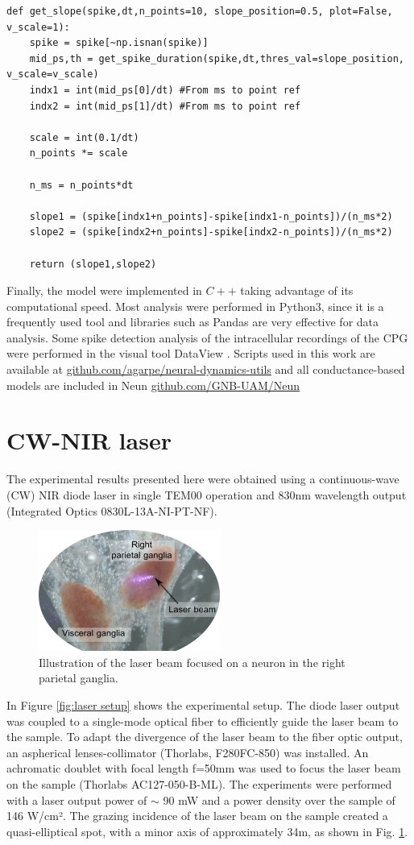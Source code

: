 \begin{lstlisting}
def get_slope(spike,dt,n_points=10, slope_position=0.5, plot=False, v_scale=1):
	spike = spike[~np.isnan(spike)] 
	mid_ps,th = get_spike_duration(spike,dt,thres_val=slope_position, v_scale=v_scale)
	indx1 = int(mid_ps[0]/dt) #From ms to point ref
	indx2 = int(mid_ps[1]/dt) #From ms to point ref
	
	scale = int(0.1/dt)
	n_points *= scale
	
	n_ms = n_points*dt
	
	slope1 = (spike[indx1+n_points]-spike[indx1-n_points])/(n_ms*2) 
	slope2 = (spike[indx2+n_points]-spike[indx2-n_points])/(n_ms*2)

	return (slope1,slope2)
\end{lstlisting}

Finally, the model were implemented in $C++$ taking advantage of its computational speed. Most analysis were performed in Python3, since it is a frequently used tool and libraries such as Pandas are very effective for data analysis. Some spike detection analysis of the intracellular recordings of the CPG were performed in the visual tool DataView \parencite{heitler_dataview_2007}. Scripts used in this work are available at \href{https://github.com/agarpe/neural-dynamics-utils}{github.com/agarpe/neural-dynamics-utils} and all conductance-based models are included in Neun \href{https://github.com/GNB-UAM/Neun}{github.com/GNB-UAM/Neun}


\section{CW-NIR laser}
The experimental results presented here were obtained using a continuous-wave (CW) NIR diode laser in single TEM00 operation and 830nm wavelength output (Integrated Optics 0830L-13A-NI-PT-NF). 
\begin{figure}
    \centering
	\includegraphics{img/laser/laser-beam.png}
	\caption{Illustration of the laser beam focused on a neuron in the right parietal ganglia.}
	\label{fig:laser beam}
\end{figure} 
In Figure \ref{fig:laser setup} shows the experimental setup. The diode laser output was coupled to a single-mode optical fiber to efficiently guide the laser beam to the sample. To adapt the divergence of the laser beam to the fiber optic output, an aspherical lenses-collimator (Thorlabs, F280FC-850) was installed. An achromatic doublet with focal length f=50mm was used to focus the laser beam on the sample (Thorlabs AC127-050-B-ML). The experiments were performed with a laser output power of $\sim$ 90 mW and a power density over the sample of 146 W/cm². The grazing incidence of the laser beam on the sample created a quasi-elliptical spot, with a minor axis of approximately 34{\textmu}m, as shown in Fig. \ref{fig:laser beam}.

